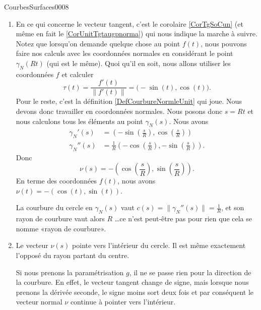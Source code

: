 \begin{corrige}{CourbesSurfaces0008}
\begin{enumerate}
		\item	
			En ce qui concerne le vecteur tangent, c'est le corolaire \ref{CorTgSoCun} (et même en fait le \ref{CorUnitTgtaugpnorma}) qui nous indique la marche à suivre. Notez que lorsqu'on demande quelque chose au point $f(t)$, nous pouvons faire nos calculs avec les coordonnées normales en considérant le point $\gamma_N(Rt)$ (qui est le même). Quoi qu'il en soit, nous allons utiliser les coordonnées $f$ et calculer 
			\begin{equation}
				\tau(t)=\frac{ f'(t) }{ \| f'(t) \| }=\big( -\sin(t),\cos(t) \big).
			\end{equation}
			Pour le reste, c'est la définition \ref{DefCourbureNormleUnit} qui joue. Nous devons donc travailler en coordonnées normales. Nous posons donc $s=Rt$ et nous calculons tous les éléments au point $\gamma_N(s)$. Nous avons
			\begin{subequations}
				\begin{align}
					\gamma_N'(s)&=\left( -\sin(\frac{ s }{ R }),\cos(\frac{ s }{ R }) \right)\\
					\gamma_N''(s)&=\frac{1}{ R }\left( -\cos(\frac{ s }{ R }),-\sin(\frac{ s }{ R }) \right).
				\end{align}
			\end{subequations}
			Donc
			\begin{equation}
				\nu(s)=-\left( \cos(\frac{ s }{ R }),\sin(\frac{ s }{ R }) \right).
			\end{equation}
			En terme des coordonnées $f(t)$, nous avons $\nu(t)=-\left( \cos(t),\sin(t) \right)$.
			
			La courbure du cercle en $\gamma_N(s)$ vaut $c(s)=\| \gamma_N''(s) \|=\frac{1}{ R }$, et son rayon de courbure vaut alors $R$ \ldots ce n'est peut-être pas pour rien que cela se nomme «rayon de courbure».

		\item
			Le vecteur $\nu(s)$ pointe vers l'intérieur du cercle. Il est même exactement l'opposé du rayon partant du centre.

			Si nous prenons la paramétrisation $g$, il ne se passe rien pour la direction de la courbure. En effet, le vecteur tangent change de signe, mais lorsque nous prenons la dérivée seconde, le signe moins sort deux fois et par conséquent le vecteur normal $\nu$ continue à pointer vers l'intérieur.

	\end{enumerate}

\end{corrige}
